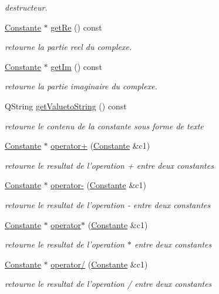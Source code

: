 \begin{DoxyCompactItemize}
\begin{DoxyCompactList}\small\item\em destructeur. \end{DoxyCompactList}\item 
\hyperlink{class_constante}{Constante} $\ast$ \hyperlink{class_c_complexe_a79bf21767456df407987744abc6da88b}{get\-Re} () const 
\begin{DoxyCompactList}\small\item\em retourne la partie reel du complexe. \end{DoxyCompactList}\item 
\hyperlink{class_constante}{Constante} $\ast$ \hyperlink{class_c_complexe_a98d9b7c06bb830be93ab1306a57d716f}{get\-Im} () const 
\begin{DoxyCompactList}\small\item\em retourne la partie imaginaire du complexe. \end{DoxyCompactList}\item 
Q\-String \hyperlink{class_c_complexe_a2ac287ee5fac2c2365fe618f47d235dc}{get\-Valueto\-String} () const 
\begin{DoxyCompactList}\small\item\em retourne le contenu de la constante sous forme de texte \end{DoxyCompactList}\item 
\hyperlink{class_constante}{Constante} $\ast$ \hyperlink{class_c_complexe_a3ff3a06dde38c3fba33fafbef7b3cd99}{operator+} (\hyperlink{class_constante}{Constante} \&c1)
\begin{DoxyCompactList}\small\item\em retourne le resultat de l'operation + entre deux constantes \end{DoxyCompactList}\item 
\hyperlink{class_constante}{Constante} $\ast$ \hyperlink{class_c_complexe_a2661c1f2dedc3f417af1a941f11ca583}{operator-\/} (\hyperlink{class_constante}{Constante} \&c1)
\begin{DoxyCompactList}\small\item\em retourne le resultat de l'operation -\/ entre deux constantes \end{DoxyCompactList}\item 
\hyperlink{class_constante}{Constante} $\ast$ \hyperlink{class_c_complexe_aa0d80726cdd5b1aba17ac25c2bed1194}{operator$\ast$} (\hyperlink{class_constante}{Constante} \&c1)
\begin{DoxyCompactList}\small\item\em retourne le resultat de l'operation $\ast$ entre deux constantes \end{DoxyCompactList}\item 
\hyperlink{class_constante}{Constante} $\ast$ \hyperlink{class_c_complexe_a518ad5669537f64418ef6007687a3297}{operator/} (\hyperlink{class_constante}{Constante} \&c1)
\begin{DoxyCompactList}\small\item\em retourne le resultat de l'operation / entre deux constantes \end{DoxyCompactList}\end{DoxyCompactItemize}



